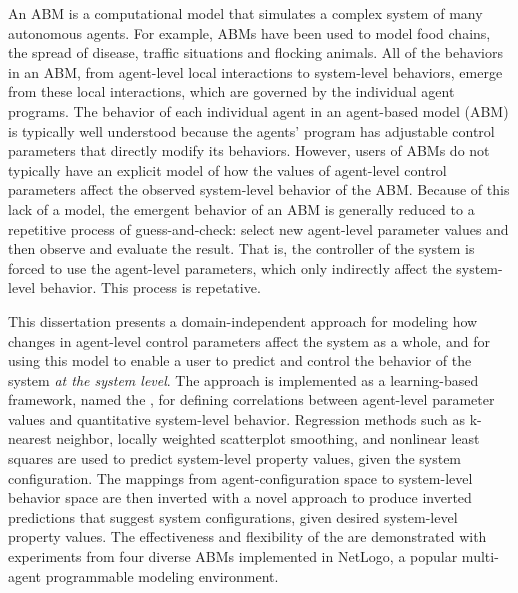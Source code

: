 \begin{singlespace}

An ABM is a computational model that simulates a complex system of many autonomous agents.
For example, ABMs have been used to model food chains, the spread of disease, traffic situations and flocking animals.
All of the behaviors in an ABM, from agent-level local interactions to system-level behaviors, emerge from these local interactions, which are governed by the individual agent programs.
The behavior of each individual agent in an agent-based model (ABM) is typically well understood because the agents' program has adjustable control parameters that directly modify its behaviors.
However, users of ABMs do not typically have an explicit model of how the values of agent-level control parameters affect the observed system-level behavior of the ABM.
Because of this lack of a model, the emergent behavior of an ABM is generally reduced to a repetitive process of guess-and-check: select new agent-level parameter values and then observe and evaluate the result.
That is, the controller of the system is forced to use the agent-level parameters, which only indirectly affect the system-level behavior.
This process is repetative.

This dissertation presents a domain-independent approach for modeling how changes in agent-level control parameters affect the system as a whole, and for using this model to enable a user to predict and control the behavior of the system \textit{at the system level}.
The approach is implemented as a learning-based framework, named the \framework,  for defining correlations between agent-level parameter values and quantitative system-level behavior.
Regression methods such as k-nearest neighbor, locally weighted scatterplot smoothing, and nonlinear least squares are used to predict system-level property values, given the system configuration.
The mappings from agent-configuration space to system-level behavior space are then inverted with a novel approach to produce inverted predictions that suggest system configurations, given desired system-level property values.
The effectiveness and flexibility of the \framework are demonstrated with experiments from four diverse ABMs implemented in NetLogo, a popular multi-agent programmable modeling environment.

\end{singlespace}

\par\vfil

